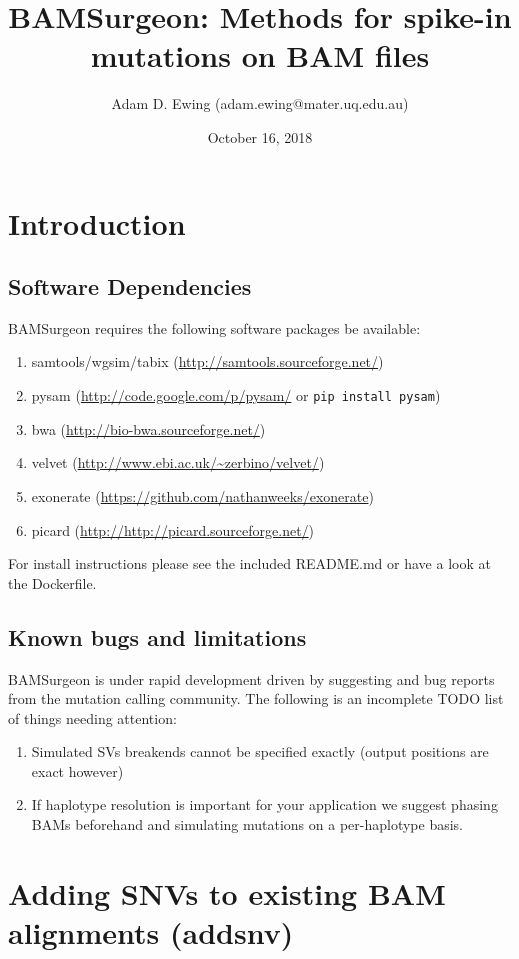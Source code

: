 \documentclass[letterpaper,11pt]{article}
\title{BAMSurgeon: Methods for spike-in mutations on BAM files}
\author{Adam D. Ewing (adam.ewing@mater.uq.edu.au)}
\begin{document}
 \date{October 16, 2018}
 \maketitle

\section{Introduction}
\subsection{Software Dependencies}
BAMSurgeon requires the following software packages be available:

\begin{enumerate}
  \item samtools/wgsim/tabix (\url{http://samtools.sourceforge.net/})
  \item pysam (\url{http://code.google.com/p/pysam/} or \texttt{pip install pysam})
  \item bwa (\url{http://bio-bwa.sourceforge.net/})
  \item velvet (\url{http://www.ebi.ac.uk/~zerbino/velvet/})
  \item exonerate (\url{https://github.com/nathanweeks/exonerate})
  \item picard (\url{http://http://picard.sourceforge.net/})
\end{enumerate}

For install instructions please see the included README.md or have a look at the Dockerfile.


\subsection{Known bugs and limitations}
BAMSurgeon is under rapid development driven by suggesting and bug reports from the mutation calling community. The following is an incomplete TODO list of things needing attention:

\begin{enumerate}
\item Simulated SVs breakends cannot be specified exactly (output positions are exact however)
\item If haplotype resolution is important for your application we suggest phasing BAMs beforehand and simulating mutations on a per-haplotype basis.
\end{enumerate}



\section{Adding SNVs to existing BAM alignments (addsnv)}
\end{document}
